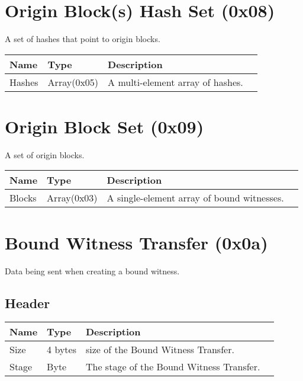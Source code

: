 \documentclass[11pt]{article}
\begin{document}
\section{Origin Block(s) Hash Set (0x08)}
A set of hashes that point to origin blocks.
\begin{center}
\begin{tabular}{ |l|l|l|l| } 
\hline
\textbf{Name} & \textbf{Type} & \textbf{Description}\\
\hline
Hashes & Array(0x05) & A multi-element array of hashes.\\  
 
\hline
\end{tabular}
\end{center}

\section{Origin Block Set (0x09)}
A set of origin blocks.
\begin{center}
\begin{tabular}{ |l|l|l|l| } 
\hline
\textbf{Name} & \textbf{Type} & \textbf{Description}\\
\hline
Blocks & Array(0x03) & A single-element array of bound witnesses.\\  
 
\hline
\end{tabular}
\end{center}

\section{Bound Witness Transfer (0x0a)}
Data being sent when creating a bound witness.

\subsection{Header}
\begin{center}

\begin{tabular}{ |l|l|l|l| } 
\hline
\textbf{Name} & \textbf{Type} & \textbf{Description}\\
\hline
Size & 4 bytes & size of the Bound Witness Transfer.\\  
Stage & Byte & The stage of the Bound Witness Transfer.\\  
\hline
\end{tabular}
\end{center}
\end{document}
